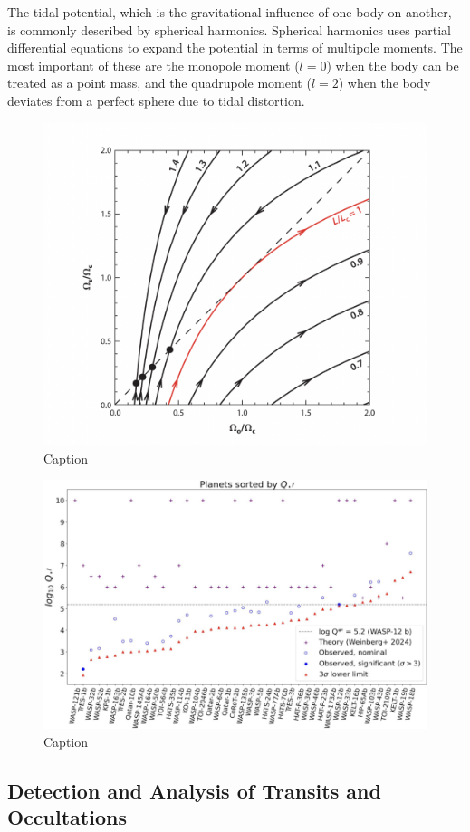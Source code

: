 \documentclass[oneside,12pt]{amsart}
\numberwithin{page}{section}
\begin{document}
The tidal potential, which is the gravitational influence of one body on another, is commonly described by spherical harmonics. Spherical harmonics uses partial differential equations to expand the potential in terms of multipole moments. The most important of these are the monopole moment ($l = 0$) when the body can be treated as a point mass, and the quadrupole moment ($l=2$) when the body deviates from a perfect sphere due to tidal distortion. 

\begin{figure}[htbp]
    \centering
    \includegraphics[width=0.5\linewidth]{figs/ogilvie_fig10.png}
    \caption{Caption}
    \label{fig:ogilvie-fig10}
\end{figure}

\begin{figure}[htbp]
    \centering
    \includegraphics[width=\linewidth]{figs/adams_fig11.png}
    \caption{Caption}
    \label{fig:adams-fig11}
\end{figure}




\subsection{Detection and Analysis of Transits and Occultations}
\end{document}
